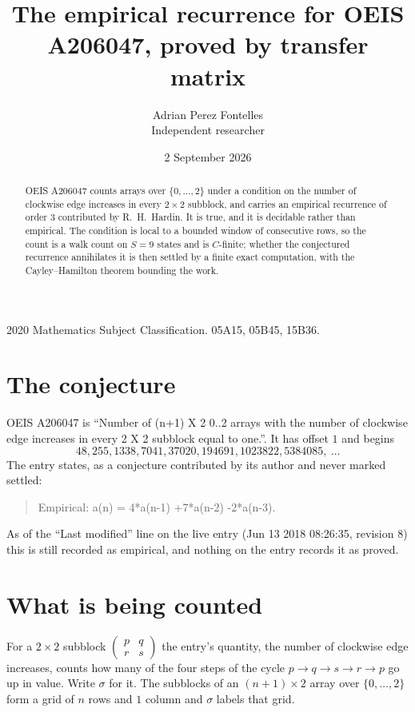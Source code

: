 \documentclass[11pt,a4paper]{article}
\title{The empirical recurrence for OEIS A206047, proved by transfer matrix}
\author{Adrian Perez Fontelles\\ \small Independent researcher}
\date{2 September 2026}
\theoremstyle{plain}
\theoremstyle{definition}
\begin{document}
\maketitle

\begin{abstract}
OEIS A206047 counts arrays over $\{0,\dots,2\}$ under a condition on the number of clockwise edge increases
in every $2\times2$ subblock, and carries an empirical recurrence of order $3$ contributed by
R.~H.~Hardin. It is true, and it is decidable rather than empirical. The condition is local to
a bounded window of consecutive rows, so the count is a walk count on $S=9$ states and is
$C$-finite; whether the conjectured recurrence annihilates it is then settled by a finite exact
computation, with the Cayley--Hamilton theorem bounding the work.
\end{abstract}

\noindent\small 2020 Mathematics Subject Classification. 05A15, 05B45, 15B36.\normalsize

\section{The conjecture}

OEIS A206047 is ``Number of (n+1) X 2 0..2 arrays with the number of clockwise edge increases in every 2 X 2 subblock equal to one.''. It has offset $1$ and begins
\[
48, 255, 1338, 7041, 37020, 194691, 1023822, 5384085,\ \dots
\]
The entry states, as a conjecture contributed by its author and never marked settled:
\begin{quote}
Empirical: a(n) = 4*a(n-1) +7*a(n-2) -2*a(n-3).
\end{quote}
As of the ``Last modified'' line on the live entry (Jun 13 2018 08:26:35, revision 8) this is still
recorded as empirical, and nothing on the entry records it as proved.

\section{What is being counted}

For a $2\times2$ subblock $\begin{pmatrix}p&q\\r&s\end{pmatrix}$ the
entry's quantity, the number of clockwise edge increases, counts how many of the four steps of the cycle $p\to q\to s\to r\to p$ go up in value. Write $\sigma$ for it. The subblocks of an
$(n+1)\times2$ array over $\{0,\dots,2\}$ form a grid of $n$ rows and $1$
column and $\sigma$ labels that grid.
\end{document}
